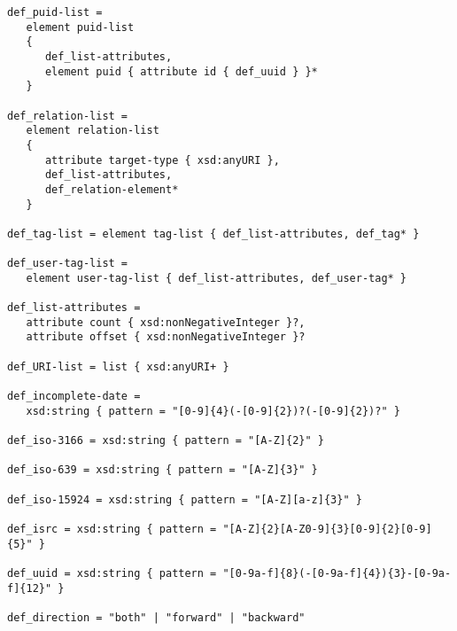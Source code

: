 \begin{Verbatim}[fontsize=\relsize{-2}]
def_puid-list =
   element puid-list
   {
      def_list-attributes,
      element puid { attribute id { def_uuid } }*
   }

def_relation-list =
   element relation-list
   {
      attribute target-type { xsd:anyURI },
      def_list-attributes,
      def_relation-element*
   }

def_tag-list = element tag-list { def_list-attributes, def_tag* }

def_user-tag-list =
   element user-tag-list { def_list-attributes, def_user-tag* }

def_list-attributes =
   attribute count { xsd:nonNegativeInteger }?,
   attribute offset { xsd:nonNegativeInteger }?

def_URI-list = list { xsd:anyURI+ }

def_incomplete-date =
   xsd:string { pattern = "[0-9]{4}(-[0-9]{2})?(-[0-9]{2})?" }

def_iso-3166 = xsd:string { pattern = "[A-Z]{2}" }

def_iso-639 = xsd:string { pattern = "[A-Z]{3}" }

def_iso-15924 = xsd:string { pattern = "[A-Z][a-z]{3}" }

def_isrc = xsd:string { pattern = "[A-Z]{2}[A-Z0-9]{3}[0-9]{2}[0-9]{5}" }

def_uuid = xsd:string { pattern = "[0-9a-f]{8}(-[0-9a-f]{4}){3}-[0-9a-f]{12}" }

def_direction = "both" | "forward" | "backward"
\end{Verbatim}
